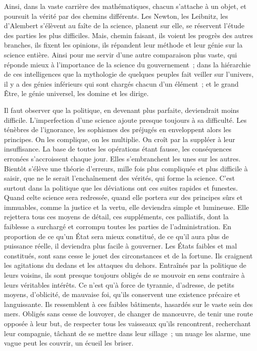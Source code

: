 \documentclass[french,twoside]{book} %
\begin{document}
Ainsi, dans la vaste carrière des mathématiques, chacun s’attache à un objet, et poursuit la vérité par des chemins différents. Les Newton, les Leibnitz, les d’Alembert s’élèvent au faîte de la science, planent sur elle, se réservent l’étude des parties les plus difficiles. Mais, chemin faisant, ils voient les progrès des autres branches, ils fixent les opinions, ils répandent leur méthode et leur génie sur la science entière. Ainsi pour me servir d’une autre comparaison plus vaste, qui réponde mieux à l’importance de la science du gouvernement ; dans la hiérarchie de ces intelligences que la mythologie de quelques peuples fait veiller sur l’univers, il y a des génies inférieurs qui sont chargés chacun d’un élément ; et le grand Être, le génie universel, les domine et les dirige.\par
Il faut observer que la politique, en devenant plus parfaite, deviendrait moins difficile. L’imperfection d’une science ajoute presque toujours à sa difficulté. Les ténèbres de l’ignorance, les sophismes des préjugés en enveloppent alors les principes. On les complique, on les multiplie. On croît par la suppléer à leur insuffisance. La base de toutes les opérations étant fausse, les conséquences erronées s’accroissent chaque jour. Elles s’embranchent les unes sur les autres. Bientôt s’élève une théorie d’erreurs, mille fois plus compliquée et plus difficile à saisir, que ne le serait l’enchaînement des vérités, qui forme la science. C’est surtout dans la politique que les déviations ont ces suites rapides et funestes. Quand celte science sera redressée, quand elle portera sur des principes sûrs et immuables, comme la justice et la vertu, elle deviendra simple et lumineuse. Elle rejettera tous ces moyens de détail, ces suppléments, ces palliatifs, dont la faiblesse a surchargé et corrompu toutes les parties de l’administration. En proportion de ce qu’un État sera mieux constitué, de ce qu’il aura plus de puissance réelle, il deviendra plus facile à gouverner. Les États faibles et mal constitués, sont sans cesse le jouet des circonstances et de la fortune. Ils craignent les agitations du dedans et les attaques du dehors. Entraînés par la politique de leurs voisins, ils sont presque toujours obligés de se mouvoir en sens contraire à leurs véritables intérêts. Ce n’est qu’à force de tyrannie, d’adresse, de petits moyens, d’oblicité, de mauvaise foi, qu’ils conservent une existence précaire et languissante. Ils ressemblent à ces faibles bâtiments, hasardés sur le vaste sein des mers. Obligés sans cesse de louvoyer, de changer de manœuvre, de tenir une route opposée à leur but, de respecter tous les vaisseaux qu’ils rencontrent, recherchant leur compagnie, tâchant de se mettre dans leur sillage ; un nuage les alarme, une vague peut les couvrir, un écueil les briser.\par
\end{document}

